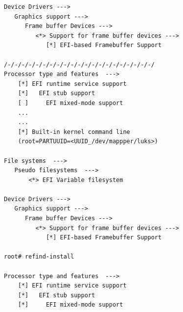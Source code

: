 \documentclass[10pt, a4paper, onecolumn, oneside, titlepage, openany]{book}
\begin{document}
\begin{enumerate}
\begin{enumerate}
\begin{Verbatim}[commandchars=\\\{\}]
Device Drivers --->
   Graphics support --->
      Frame buffer Devices --->
         <*> Support for frame buffer devices --->
            [*] EFI-based Framebuffer Support

/-/-/-/-/-/-/-/-/-/-/-/-/-/-/-/-/-/-/-/-/-/
Processor type and features  --->
    [*] EFI runtime service support
    [*]   EFI stub support
    [ ]     EFI mixed-mode support
    ...
    ...
    [*] Built-in kernel command line
    (root=PARTUUID=<UUID_/dev/mappper/luks>)

File systems  --->
   Pseudo filesystems  --->
       <*> EFI Variable filesystem

Device Drivers --->
   Graphics support --->
      Frame buffer Devices --->
         <*> Support for frame buffer devices --->
            [*] EFI-based Framebuffer Support

root# refind-install

Processor type and features  --->
    [*] EFI runtime service support
    [*]   EFI stub support
    [*]     EFI mixed-mode support


\end{Verbatim}
\end{enumerate}
\end{enumerate}
\end{document}
